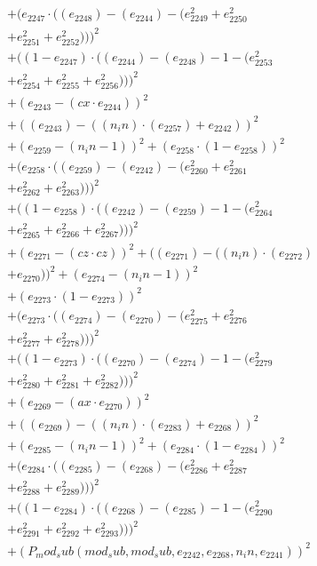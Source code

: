 \documentclass[10pt, a4paper]{article}
\begin{document}
\begin{small}
\begin{align*}
& + (e_{2247}  \cdot  ((e_{2248}) - (e_{2244}) - (e_{2249}^{2} + e_{2250}^{2} \\
& + e_{2251}^{2} + e_{2252}^{2})))^{2} \\
& + ((1 - e_{2247})  \cdot  ((e_{2244}) - (e_{2248}) - 1 - (e_{2253}^{2} \\
& + e_{2254}^{2} + e_{2255}^{2} + e_{2256}^{2})))^{2} \\
& + (e_{2243} - (cx  \cdot  e_{2244}))^{2} \\
& + ((e_{2243}) - ((n_in)  \cdot  (e_{2257}) + e_{2242}))^{2} \\
& + (e_{2259} - (n_in - 1))^{2} + (e_{2258}  \cdot  (1 - e_{2258}))^{2} \\
& + (e_{2258}  \cdot  ((e_{2259}) - (e_{2242}) - (e_{2260}^{2} + e_{2261}^{2} \\
& + e_{2262}^{2} + e_{2263}^{2})))^{2} \\
& + ((1 - e_{2258})  \cdot  ((e_{2242}) - (e_{2259}) - 1 - (e_{2264}^{2} \\
& + e_{2265}^{2} + e_{2266}^{2} + e_{2267}^{2})))^{2} \\
& + (e_{2271} - (cz  \cdot  cz))^{2} + ((e_{2271}) - ((n_in)  \cdot  (e_{2272}) \\
& + e_{2270}))^{2} + (e_{2274} - (n_in - 1))^{2} \\
& + (e_{2273}  \cdot  (1 - e_{2273}))^{2} \\
& + (e_{2273}  \cdot  ((e_{2274}) - (e_{2270}) - (e_{2275}^{2} + e_{2276}^{2} \\
& + e_{2277}^{2} + e_{2278}^{2})))^{2} \\
& + ((1 - e_{2273})  \cdot  ((e_{2270}) - (e_{2274}) - 1 - (e_{2279}^{2} \\
& + e_{2280}^{2} + e_{2281}^{2} + e_{2282}^{2})))^{2} \\
& + (e_{2269} - (ax  \cdot  e_{2270}))^{2} \\
& + ((e_{2269}) - ((n_in)  \cdot  (e_{2283}) + e_{2268}))^{2} \\
& + (e_{2285} - (n_in - 1))^{2} + (e_{2284}  \cdot  (1 - e_{2284}))^{2} \\
& + (e_{2284}  \cdot  ((e_{2285}) - (e_{2268}) - (e_{2286}^{2} + e_{2287}^{2} \\
& + e_{2288}^{2} + e_{2289}^{2})))^{2} \\
& + ((1 - e_{2284})  \cdot  ((e_{2268}) - (e_{2285}) - 1 - (e_{2290}^{2} \\
& + e_{2291}^{2} + e_{2292}^{2} + e_{2293}^{2})))^{2} \\
& + (P_mod_sub(mod_sub, mod_sub, e_{2242}, e_{2268}, n_in, e_{2241}))^{2} \\

\end{align*}
\end{small}
\end{document}

